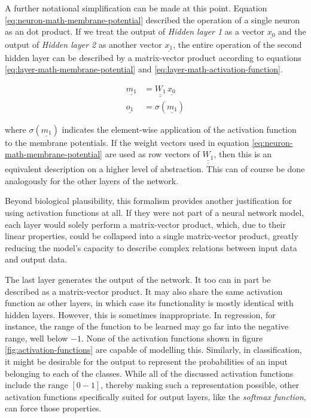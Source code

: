 \documentclass[11pt, a4paper]{article}
\newcommand\braces[1]{\left(#1\right)}
\renewcommand{\vec}[1]{\underline{#1}}
\newcommand{\mat}[1]{\underline{\underline{#1}}}
\begin{document}
A further notational simplification can be made at this point. Equation \eqref{eq:neuron-math-membrane-potential} described the operation of a single neuron as an dot product. If we treat the output of \emph{Hidden layer 1} as a vector $\vec{x_0}$ and the output of \emph{Hidden layer 2} as another vector $\vec{x_1}$, the entire operation of the second hidden layer can be described by a matrix-vector product according to equations \eqref{eq:layer-math-membrane-potential} and \eqref{eq:layer-math-activation-function}.

\begin{align}
	\vec{m_1} &= \mat{W_{1}} \, \vec{x_0} \label{eq:layer-math-membrane-potential} \\
	\vec{o_1} &= \sigma \braces{\vec{m_1}} \label{eq:layer-math-activation-function}
\end{align}

where $\sigma \braces{\vec{m_1}}$ indicates the element-wise application of the activation function to the membrane potentials. If the weight vectors used in equation \eqref{eq:neuron-math-membrane-potential} are used as row vectors of $\mat{W_1}$, then this is an equivalent description on a higher level of abstraction. This can of course be done analogously for the other layers of the network.

Beyond biological plausibility, this formalism provides another justification for using activation functions at all. If they were not part of a neural network model, each layer would solely perform a matrix-vector product, which, due to their linear properties, could be collapsed into a single matrix-vector product, greatly reducing the model's capacity to describe complex relations between input data and output data.

The last layer generates the output of the network. It too can in part be described as a matrix-vector product. It may also share the same activation function as other layers, in which case its functionality is mostly identical with hidden layers. However, this is sometimes inappropriate. In regression, for instance, the range of the function to be learned may go far into the negative range, well below $-1$. None of the activation functions shown in figure \ref{fig:activation-functions} are capable of modelling this. Similarly, in classification, it might be desirable for the output to represent the probabilities of an input belonging to each of the classes. While all of the discussed activation functions include the range $[0-1]$, thereby making such a representation possible, other activation functions specifically suited for output layers, like the \emph{softmax function}, can force those properties.
\end{document}

